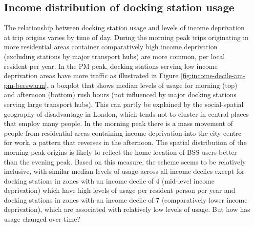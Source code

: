\documentclass[]{article}
\begin{document}
\hypertarget{income-distribution-of-docking-station-usage}{%
\subsection{Income distribution of docking station usage}\label{income-distribution-of-docking-station-usage}}

The relationship between docking station usage and levels of income deprivation at trip origins varies by time of day.
During the morning peak trips originating in more residential areas container comparatively high income deprivation (excluding stations by major transport hubs) are more common, per local resident per year.
In the PM peak, docking stations serving low income deprivation areas have more traffic as illustrated in Figure \ref{fig:income-decile-am-pm-beeswarm}, a boxplot that shows median levels of usage for morning (top) and afternoon (bottom) rush hours (not influenced by major docking stations serving large transport hubs).
This can partly be explained by the social-spatial geography of disadvantage in London, which tends not to cluster in central places that employ many people.
In the morning peak there is a mass movement of people from residential areas containing income deprivation into the city centre for work, a pattern that reverses in the afternoon.
The spatial distribution of the morning peak origins is likely to reflect the home location of BSS users better than the evening peak.
Based on this measure, the scheme seems to be relatively inclusive, with similar median levels of usage across all income deciles except for docking stations in zones with an income decile of 4 (mid-level income deprivation) which have high levels of usage per resident person per year and docking stations in zones with an income decile of 7 (comparatively lower income deprivation), which are associated with relatively low levels of usage.
But how has usage changed over time?
\end{document}
